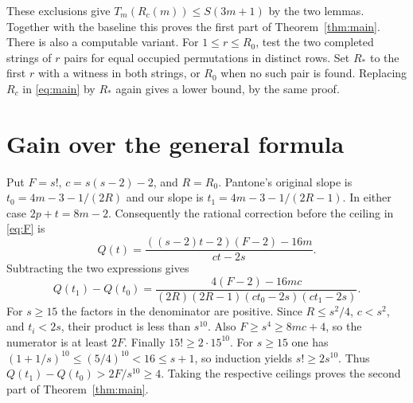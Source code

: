 \documentclass[11pt]{article}
\begin{document}
These exclusions give $T_m(R_c(m))\le S(3m+1)$ by the two lemmas.
Together with the baseline this proves the first part of Theorem~\ref{thm:main}.
There is also a computable variant. For $1\le r\le R_0$, test the two
completed strings of $r$ pairs for equal occupied permutations in distinct
rows. Set $R_*$ to the first $r$ with a witness in both strings, or $R_0$
when no such pair is found. Replacing $R_c$ in \eqref{eq:main} by $R_*$
again gives a lower bound, by the same proof.

\section{Gain over the general formula}
Put $F=s!$, $c=s(s-2)-2$, and $R=R_0$. Pantone's original slope is
$t_0=4m-3-1/(2R)$ and our slope is $t_1=4m-3-1/(2R-1)$.
In either case $2p+t=8m-2$. Consequently the rational correction before the
ceiling in \eqref{eq:F} is
\[
 Q(t)=\frac{((s-2)t-2)(F-2)-16m}{ct-2s}.
\]
Subtracting the two expressions gives
\[
 Q(t_1)-Q(t_0)=
 \frac{4(F-2)-16mc}
 {(2R)(2R-1)(ct_0-2s)(ct_1-2s)}.
\]
For $s\ge15$ the factors in the denominator are positive. Since
$R\le s^2/4$, $c<s^2$, and $t_i<2s$, their product is less than $s^{10}$.
Also $F\ge s^4\ge8mc+4$, so the numerator is at least $2F$. Finally
$15!\ge2\cdot15^{10}$. For $s\ge15$ one has
$(1+1/s)^{10}\le(5/4)^{10}<16\le s+1$, so induction yields
$s!\ge2s^{10}$. Thus $Q(t_1)-Q(t_0)>2F/s^{10}\ge4$.
Taking the respective ceilings proves the second part of Theorem~\ref{thm:main}.
\end{document}
